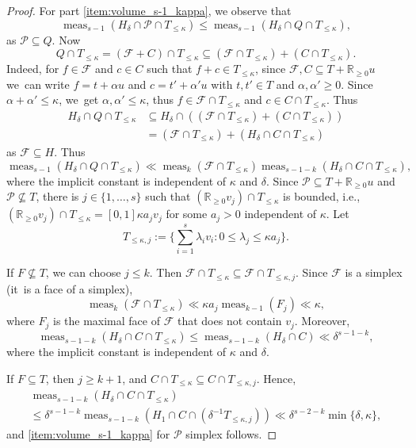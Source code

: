 \documentclass[11pt]{article}
\newcommand{\ie}{i.e.,\xspace}
\numberwithin{equation}{section}
\newcommand\RR{\mathbb{R}}
\DeclareMathOperator{\meas}{meas}
\theoremstyle{definition}
\numberwithin{theorem}{section}
\begin{document}
\begin{proof}
For part \eqref{item:volume_s-1_kappa}, we observe that
\[
\meas_{s-1}(H_\delta\cap\mathcal P\cap T_{\leq\kappa}) \leq \meas_{s-1}(H_{\delta}\cap Q\cap T_{\leq\kappa}),
\]
as $\mathcal P\subseteq Q$.
Now
\[
Q\cap T_{\leq\kappa}= (\mathcal F+C)\cap T_{\leq\kappa}\subseteq(\mathcal F\cap T_{\leq\kappa}) + (C\cap T_{\leq\kappa}).
\]
Indeed, for $f\in \mathcal F$ and $c\in C$ such that $f+c\in T_{\leq\kappa}$, since $\mathcal F, C\subseteq T+\RR_{\geq0}u$ we~can write $f=t+\alpha u$ and $c=t'+\alpha'u$ with $t,t'\in T$ and $\alpha,\alpha'\geq 0$. Since $\alpha+\alpha'\leq \kappa$, we~get $\alpha,\alpha'\leq\kappa$, thus $f\in\mathcal F\cap T_{\leq\kappa}$ and $c\in C\cap T_{\leq\kappa}$. Thus
\begin{equation}\label{eq:volume:decomposition}
\begin{aligned}
H_{\delta}\cap Q\cap T_{\leq\kappa}
&\subseteq H_\delta\cap ((\mathcal F\cap T_{\leq\kappa}) + (C\cap T_{\leq\kappa}))\\
&= (\mathcal F\cap T_{\leq\kappa}) + (H_\delta\cap C\cap T_{\leq\kappa})
\end{aligned}
\end{equation}
as $\mathcal F\subseteq H$.
Thus
\[
\meas_{s-1}(H_{\delta}\cap Q\cap T_{\leq\kappa})
\ll \meas_k(\mathcal F\cap T_{\leq\kappa})
\meas_{s-1-k}(H_{\delta}\cap C\cap T_{\leq\kappa}),
\]
where the implicit constant is independent of $\kappa$ and $\delta$.
Since $\mathcal P\subseteq T+\RR_{\geq0} u$ and $\mathcal P\nsubseteq T$,
there is $j\in\{1,\dots,s\}$
such that $(\RR_{\geq0} v_{j})\cap T_{\leq\kappa}$ is bounded, \ie $(\RR_{\geq0} v_{j})\cap T_{\leq\kappa}=[0,1]\kappa a_{j}v_{j}$ for some
$a_{j}>0$ independent of $\kappa$.
Let \[
T_{\leq\kappa, j}:=\biggl \{\sum_{i=1}^s\lambda_i v_i:0\leq \lambda_{j}\leq \kappa a_{j} \biggr \}.
\]

If $F\not\subseteq T$, we can choose $j\leq k$. Then
$\mathcal F\cap T_{\leq\kappa}
\subseteq \mathcal F\cap T_{\leq\kappa, j}$.
Since $\mathcal F$ is a simplex (it~is a face of a simplex),
\[
\meas_k(\mathcal F\cap T_{\leq\kappa})
\ll \kappa a_{j}\meas_{k-1}(F_{j})\ll\kappa,
\]
where $F_{j}$ is the maximal face of $\mathcal F$ that does not contain $v_{j}$.
Moreover, \[
\meas_{s-1-k}(H_\delta \cap C\cap T_{\leq\kappa})
\leq \meas_{s-1-k}(H_\delta \cap C)\ll \delta^{s-1-k},
\]
where the implicit constant is independent of $\kappa$ and $\delta$.

If $F\subseteq T$, then $j\geq k+1$, and $C\cap T_{\leq\kappa} \subseteq C\cap T_{\leq\kappa, j}$.
Hence, \begin{multline*}
\meas_{s-1-k}(H_\delta\cap C\cap T_{\leq\kappa}) \\
\leq\delta^{s-1-k}\meas_{s-1-k}(H_1\cap C\cap (\delta^{-1}T_{\leq\kappa,j}))
\ll \delta^{s-2-k}\min\{\delta,\kappa\},
\end{multline*}
and \eqref{item:volume_s-1_kappa} for $\mathcal P$ simplex follows.


\end{proof}
\end{document}
